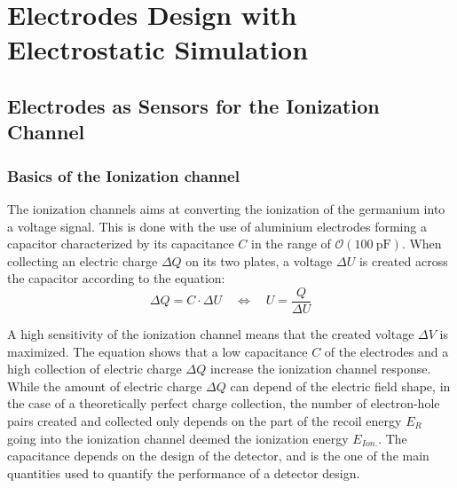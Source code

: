
\chapter{Electrodes Design with Electrostatic Simulation} %

\label{ChapterElectrodes} %




\section{Electrodes as Sensors for the Ionization Channel}

\subsection{Basics of the Ionization channel}
\label{par:basic-ion-channel}

The ionization channels aims at converting the ionization of the germanium into a voltage signal.
This is done with the use of aluminium electrodes forming a capacitor characterized by its capacitance $C$ in the range of $\mathcal{O}(\SI{100}{\pico\farad})$. When collecting an electric charge $\Delta Q$ on its two plates, a voltage $\Delta U$ is created across the capacitor according to the equation:
\begin{equation}
\Delta Q = C \cdot \Delta U
\quad \Leftrightarrow \quad
U = \frac{Q}{\Delta U}
\label{eq:capacitor-basic}
\end{equation}

A high sensitivity of the ionization channel means that the created voltage $\Delta V$ is maximized. The equation \label{eq:capacitor-basic} shows that a low capacitance $C$ of the electrodes and a high collection of electric charge $\Delta Q$ increase the ionization channel response. While the amount of electric charge $\Delta Q$ can depend of the electric field shape, in the case of a theoretically perfect charge collection, the number of electron-hole pairs created and collected only depends on the part of the recoil energy $E_R$ going into the ionization channel deemed the ionization energy $E_{Ion.}$.
The capacitance depends on the design of the detector, and is the one of the main quantities used to quantify the performance of a detector design.


